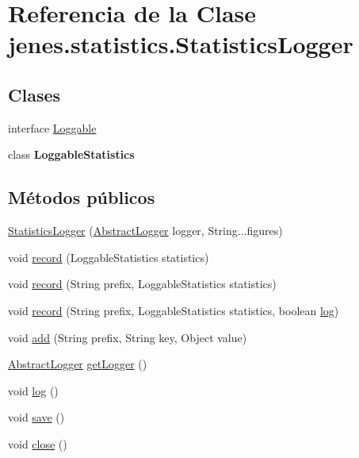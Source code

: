 \hypertarget{classjenes_1_1statistics_1_1_statistics_logger}{\section{Referencia de la Clase jenes.\-statistics.\-Statistics\-Logger}
\label{classjenes_1_1statistics_1_1_statistics_logger}
}
\subsection*{Clases}
\begin{DoxyCompactItemize}
\item 
interface \hyperlink{interfacejenes_1_1statistics_1_1_statistics_logger_1_1_loggable}{Loggable}
\item 
class {\bfseries Loggable\-Statistics}
\end{DoxyCompactItemize}
\subsection*{Métodos públicos}
\begin{DoxyCompactItemize}
\item 
\hyperlink{classjenes_1_1statistics_1_1_statistics_logger_ad4bf879bdfb673a6f82f3536fd5557b8}{Statistics\-Logger} (\hyperlink{classjenes_1_1utils_1_1_abstract_logger}{Abstract\-Logger} logger, String...\-figures)
\item 
void \hyperlink{classjenes_1_1statistics_1_1_statistics_logger_a8f7fc89cbbd6c6aad447057cd3eb6dbe}{record} (Loggable\-Statistics statistics)
\item 
void \hyperlink{classjenes_1_1statistics_1_1_statistics_logger_a31acd1617a14ed32519fc5487b30fd25}{record} (String prefix, Loggable\-Statistics statistics)
\item 
void \hyperlink{classjenes_1_1statistics_1_1_statistics_logger_a1e68400e5e02df74005d654dd52a9b34}{record} (String prefix, Loggable\-Statistics statistics, boolean \hyperlink{classjenes_1_1statistics_1_1_statistics_logger_a35539d6c4f5664617185d68c6efdf66a}{log})
\item 
void \hyperlink{classjenes_1_1statistics_1_1_statistics_logger_ac9ee13346b299296f315ad6cf247fdcf}{add} (String prefix, String key, Object value)
\item 
\hyperlink{classjenes_1_1utils_1_1_abstract_logger}{Abstract\-Logger} \hyperlink{classjenes_1_1statistics_1_1_statistics_logger_abd8fdfad668108933aa315c415050d63}{get\-Logger} ()
\item 
void \hyperlink{classjenes_1_1statistics_1_1_statistics_logger_a35539d6c4f5664617185d68c6efdf66a}{log} ()
\item 
void \hyperlink{classjenes_1_1statistics_1_1_statistics_logger_a80cde2facc21c7398050e89131a7321e}{save} ()
\item 
void \hyperlink{classjenes_1_1statistics_1_1_statistics_logger_aae3d375349f86fcd9a7ce450bae3d046}{close} ()
\end{DoxyCompactItemize}
